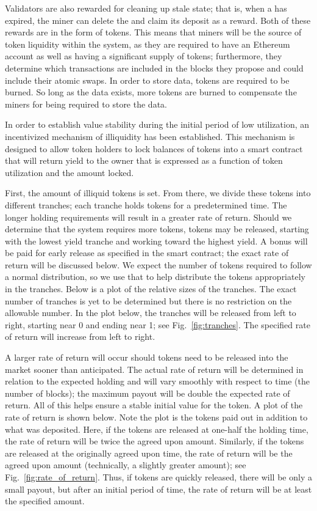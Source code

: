 Validators are also rewarded for cleaning up stale state;
that is, when a \DataStore{} has expired, the miner can delete the
\DataStore{} and claim its deposit as a reward.
Both of these rewards are in the form of \LayerTwo{} tokens.
This means that miners will be the source of token liquidity
within the system, as they are required to have an Ethereum account
as well as having a significant supply of tokens;
furthermore, they determine which transactions are included
in the blocks they propose and could include their atomic swaps.
In order to store data, \LayerTwo{} tokens are required to be burned.
So long as the data exists, more tokens are burned to compensate
the miners for being required to store the data.

In order to establish value stability during the initial period of low
utilization, an incentivized mechanism of illiquidity has been
established.
This mechanism is designed to allow token holders to lock balances of
tokens into a smart contract that will return yield to the owner that
is expressed as a function of token utilization and the amount locked.

First, the amount of illiquid tokens is set.
From there, we divide these tokens into different tranches; each
tranche holds tokens for a predetermined time.
The longer holding requirements will result in a greater rate of return.
Should we determine that the system requires more tokens, tokens may be
released, starting with the lowest yield tranche and working toward the
highest yield.
A bonus will be paid for early release as specified in the smart
contract; the exact rate of return will be discussed below.
We expect the number of tokens required to follow a normal
distribution, so we use that to help distribute the tokens
appropriately in the tranches.
Below is a plot of the relative sizes of the tranches.
The exact number of tranches is yet to be determined but there is no
restriction on the allowable number.
In the plot below, the tranches will be released from left to right,
starting near 0 and ending near 1; see Fig.~\ref{fig:tranches}.
The specified rate of return will increase from left to right.



A larger rate of return will occur should tokens need to be released
into the market sooner than anticipated.
The actual rate of return will be determined in relation to the
expected holding and will vary smoothly with respect to time (the
number of blocks); the maximum payout will be double the expected rate
of return.
All of this helps ensure a stable initial value for the token.
A plot of the rate of return is shown below.
Note the plot is the tokens paid out in addition to what was deposited.
Here, if the tokens are released at one-half the holding time, the rate
of return will be twice the agreed upon amount.
Similarly, if the tokens are released at the originally agreed upon
time, the rate of return will be the agreed upon amount (technically, a
slightly greater amount); see Fig.~\ref{fig:rate_of_return}.
Thus, if tokens are quickly released, there will be only a small
payout, but after an initial period of time, the rate of return will be
at least the specified amount.


